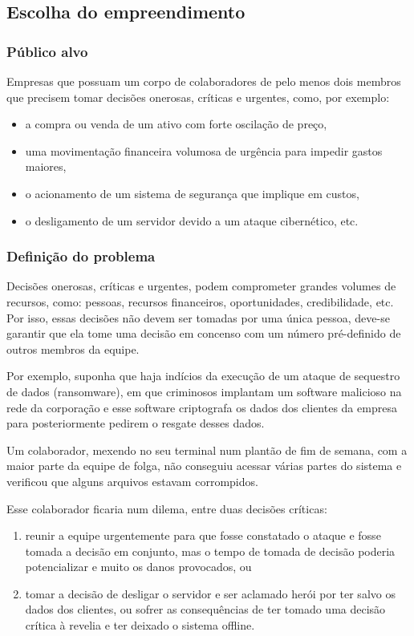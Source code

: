 \subsection{Escolha do empreendimento}

\subsubsection{Público alvo}

Empresas que possuam um corpo de colaboradores de pelo menos dois membros que 
precisem tomar decisões onerosas, críticas e urgentes, como, por
exemplo:

\begin{itemize}
        \item a compra ou venda de um ativo com forte oscilação de preço,
        \item uma movimentação financeira volumosa de urgência para impedir 
            gastos maiores, 
        \item o acionamento de um sistema de segurança que implique em custos, 
        \item o desligamento de um servidor devido a um ataque cibernético, 
            etc.
\end{itemize}

\subsubsection{Definição do problema}

Decisões onerosas, críticas e urgentes, podem comprometer grandes 
volumes de recursos, como: pessoas, recursos financeiros, oportunidades, 
credibilidade, etc. 
Por isso, essas decisões não devem ser tomadas por uma única pessoa, 
deve-se garantir que ela tome uma decisão em concenso com um número 
pré-definido de outros membros da equipe.

Por exemplo, suponha que haja indícios da execução de um ataque de sequestro 
de dados (ransomware), em que criminosos implantam um software malicioso na 
rede da corporação e esse software criptografa os dados dos clientes da 
empresa para posteriormente pedirem o resgate desses dados.

Um colaborador, mexendo no seu terminal num plantão de fim de semana, com 
a maior parte da equipe de folga, não conseguiu acessar várias partes 
do sistema e verificou que alguns arquivos estavam corrompidos. 

Esse colaborador ficaria num dilema, entre duas decisões críticas:
\begin{enumerate}
    \item reunir a equipe urgentemente para que fosse constatado o ataque e 
        fosse tomada a decisão em conjunto, mas o tempo de tomada de decisão 
        poderia potencializar e muito os danos provocados, ou
    \item tomar a decisão de desligar o servidor e ser aclamado herói por ter 
        salvo os dados dos clientes, ou sofrer as consequências de ter 
        tomado uma decisão crítica à revelia e ter deixado o sistema offline.
\end{enumerate}

